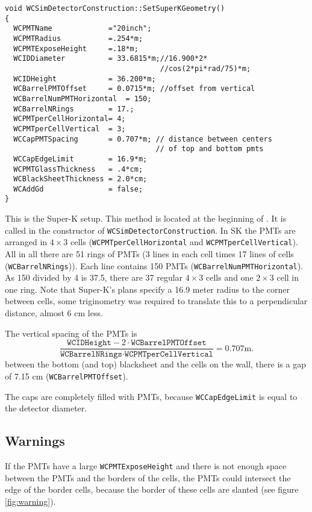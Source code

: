 \begin{lstlisting}
void WCSimDetectorConstruction::SetSuperKGeometry()
{
  WCPMTName             ="20inch";
  WCPMTRadius           =.254*m;  
  WCPMTExposeHeight     =.18*m; 
  WCIDDiameter          = 33.6815*m;//16.900*2*
                                    //cos(2*pi*rad/75)*m;
  WCIDHeight            = 36.200*m;
  WCBarrelPMTOffset     = 0.0715*m; //offset from vertical
  WCBarrelNumPMTHorizontal  = 150; 
  WCBarrelNRings        = 17.;
  WCPMTperCellHorizontal= 4;
  WCPMTperCellVertical  = 3; 
  WCCapPMTSpacing       = 0.707*m; // distance between centers
                                   // of top and bottom pmts
  WCCapEdgeLimit        = 16.9*m;
  WCPMTGlassThickness   = .4*cm;
  WCBlackSheetThickness = 2.0*cm;
  WCAddGd               = false;
}
\end{lstlisting}

This is the Super-K setup. This method is located at the beginning of . It is called in the constructor of \texttt{WCSimDetectorConstruction}.
In SK the PMTs are arranged in $4 \times 3$ cells (\texttt{WCPMTperCellHorizontal} and \texttt{WCPMTperCellVertical}). 
All in all there are 51 rings of PMTs (3 lines in each cell times 17 lines of cells (\texttt{WCBarrelNRings})). Each line contains 150 PMTs (\texttt{WCBarrelNumPMTHorizontal}). As 150 divided by 4 is 37.5, there are 37 regular $4 \times 3$ cells and one $2 \times 3$ cell in one ring.  Note that Super-K's plans specify a 16.9 meter radius to the corner between cells, some triginometry was required to translate this to a perpendicular distance, almost 6 cm less.

The vertical spacing of the PMTs is
\[
\frac{\texttt{WCIDHeight} - 2\cdot\texttt{WCBarrelPMTOffset}}
{\texttt{WCBarrelNRings} \cdot \texttt{WCPMTperCellVertical}}
= 0.707 \mathrm{m}.
\]
between the bottom (and top) blacksheet and the cells on the wall, there is a gap of 7.15 cm (\texttt{WCBarrelPMTOffset}).

The caps are completely filled with PMTs, because \texttt{WCCapEdgeLimit} is equal to the detector diameter. 



\subsection{Warnings}
If the PMTs have a large \texttt{WCPMTExposeHeight} and there is not enough space between the PMTs and the borders of the cells, the PMTs could intersect the edge of the border cells, because the border of these cells are slanted (see figure \ref{fig:warning}).
\label{sec:warnings} 

